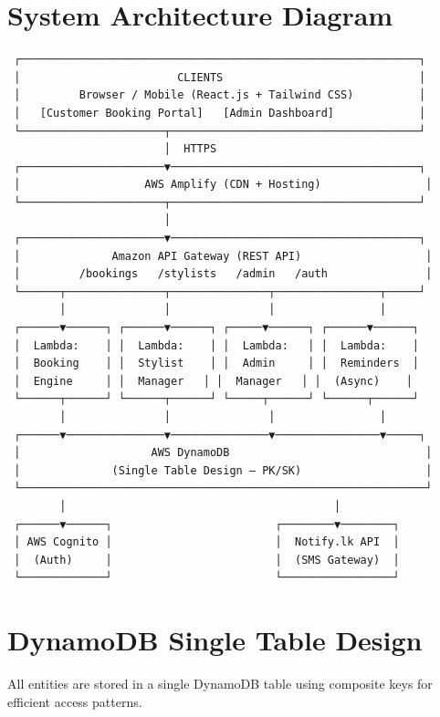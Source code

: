 \documentclass[12pt,a4paper]{report}
\begin{document}
\section{System Architecture Diagram}

\begin{verbatim}
 ┌─────────────────────────────────────────────────────────────┐
 │                        CLIENTS                              │
 │         Browser / Mobile (React.js + Tailwind CSS)          │
 │   [Customer Booking Portal]   [Admin Dashboard]             │
 └──────────────────────┬──────────────────────────────────────┘
                        │  HTTPS
 ┌──────────────────────▼──────────────────────────────────────┐
 │                   AWS Amplify (CDN + Hosting)                │
 └──────────────────────┬──────────────────────────────────────┘
                        │
 ┌──────────────────────▼──────────────────────────────────────┐
 │              Amazon API Gateway (REST API)                   │
 │         /bookings   /stylists   /admin   /auth               │
 └──────┬───────────────┬───────────────┬────────────────┬─────┘
        │               │               │                │
 ┌──────▼──────┐ ┌──────▼──────┐ ┌─────▼──────┐ ┌──────▼──────┐
 │  Lambda:    │ │  Lambda:    │ │  Lambda:   │ │  Lambda:    │
 │  Booking    │ │  Stylist    │ │  Admin     │ │  Reminders  │
 │  Engine     │ │  Manager   │ │  Manager   │ │  (Async)    │
 └──────┬──────┘ └──────┬──────┘ └─────┬──────┘ └──────┬──────┘
        │               │               │                │
 ┌──────▼───────────────▼───────────────▼────────────────▼─────┐
 │                    AWS DynamoDB                              │
 │              (Single Table Design — PK/SK)                   │
 └──────────────────────────────────────────────────────────────┘
        │                                         │
 ┌──────▼──────┐                         ┌────────▼────────┐
 │ AWS Cognito │                         │  Notify.lk API  │
 │  (Auth)     │                         │  (SMS Gateway)  │
 └─────────────┘                         └─────────────────┘
\end{verbatim}

\section{DynamoDB Single Table Design}

All entities are stored in a single DynamoDB table using composite keys for
efficient access patterns.
\end{document}
